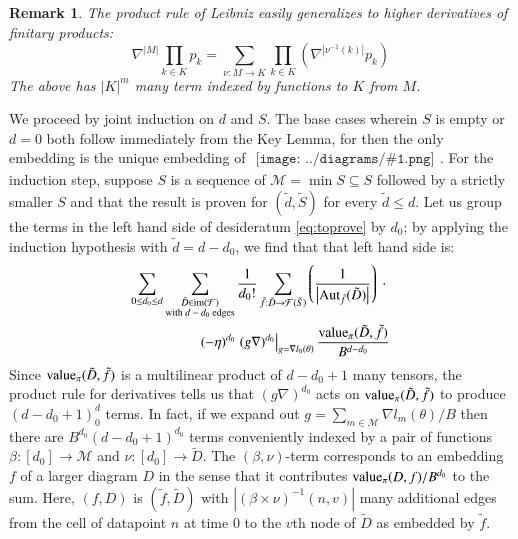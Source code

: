 \documentclass{article}
\newtheorem{rmk}{Remark}
\newcommand{\Free}{\mathcal{F}}
\newcommand{\Aut}{\text{\textnormal{Aut}}}
\newcommand{\image}{\text{\textnormal{im}}}
\newcommand{\dvalue}{\text{\textnormal{value}}}
\newcommand{\Mm}{\mathcal{M}}
\newcommand{\wrap}[1]{\left(#1\right)}
\newcommand{\wabs}[1]{\left|#1\right|}
\newcommand{\sdia}[1]{\begin{gathered}\texttt{[image: ../diagrams/\#1.png]}\end{gathered}}
\begin{document}
            \begin{rmk}
                The product rule of Leibniz easily generalizes to higher
                derivatives of finitary products:
                $$
                    \nabla^{\wabs{M}} \prod_{k \in K} p_k
                    = 
                    \sum_{\nu:M\to K} \prod_{k\in K} \wrap{
                        \nabla^{\wabs{\nu^{-1}(k)}} p_k
                    }
                $$
                The above has $\wabs{K}^m$ many term indexed by functions to
                $K$ from $M$.
            \end{rmk}

            We proceed by joint induction on $d$ and $S$.  The base cases
            wherein $S$ is empty or $d=0$ both follow immediately from the Key
            Lemma, for then the only embedding is the unique embedding of
            $\sdia{(0)()}$.  For the induction step, suppose $S$ is a sequence
            of $\Mm = \min S \subseteq S$ followed by a strictly smaller $S$
            and that the result is proven for $(\tilde d, \tilde S)$ for every
            $\tilde d \leq d$.  Let us group the terms in the left hand side of
            desideratum \ref{eq:toprove} by $d_0$; by applying the induction
            hypothesis with $\tilde d = d - d_0$, we find that that left hand
            side is:
            \begin{align*}
                \sum_{\substack{
                    0 \leq d_0 \leq d
                }}
                \sum_{\substack{
                    \tilde D \in \image(\Free) \\
                    \textnormal{with $d-d_0$ edges}
                }}
                \frac{1}{d_0!}
                \sum_{\tilde f: \tilde D\to\Free(\tilde S)} \wrap{
                    \frac{1}{\wabs{\Aut_{\tilde f}(\tilde D)}}
                }
                ~\cdot~
                \\ %
                (-\eta)^{d_0}
                \left.
                    (g \nabla)^{d_0}
                \right|_{g=\nabla l_0(\theta)}
                \frac{\dvalue_\pi(\tilde D, \tilde f)}{B^{d-d_0}}
            \end{align*}
            Since $\dvalue_\pi(\tilde D, \tilde f)$ is a multilinear product of
            $d-d_0+1$ many tensors, the product rule for derivatives tells us
            that $(g \nabla)^{d_0}$ acts on $\dvalue_\pi(\tilde D, \tilde f)$
            to produce $(d-d_0+1)^d_0$ terms.  In fact, if we expand out
            $
                g = \sum_{m\in \Mm} \nabla l_m(\theta) / B
            $ 
            then there are $B^{d_0}(d-d_0+1)^{d_0}$ terms conveniently indexed
            by a pair of functions $\beta:[d_0]\to \Mm$ and $\nu:[d_0]\to
            \tilde D$.  The $(\beta, \nu)$-term corresponds to an embedding
            $f$ of a larger diagram $D$ in the sense that it contributes
            $\dvalue_\pi(D, f)/B^{d_0}$ to the sum.  Here, $(f, D)$ is $(\tilde
            f, \tilde D)$ with $\wabs{\wrap{\beta \times \nu}^{-1}(n, v)}$ many
            additional edges from the cell of datapoint $n$ at time $0$ to the
            $v$th node of $\tilde D$ as embedded by $\tilde f$.
\end{document}
